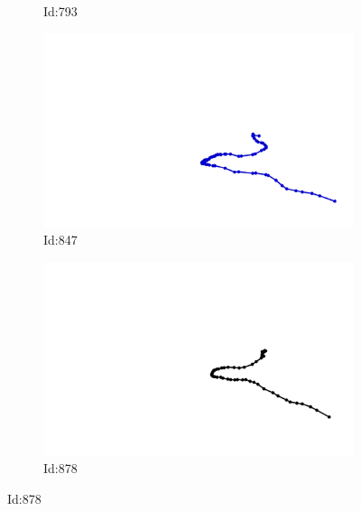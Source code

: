 \documentclass[12pt,twoside]{report}
\begin{document}
\begin{figure}
\begin{subfigure}[b]{0.20\textwidth}
\caption{Id:793}
\end{subfigure}
\begin{subfigure}[b]{0.20\textwidth}
\centering
\includegraphics[width=\textwidth]{../../trajectories/847.png}
\caption{Id:847}
\end{subfigure}
\begin{subfigure}[b]{0.20\textwidth}
\centering
\includegraphics[width=\textwidth]{../../trajectories/878.png}
\caption{Id:878}
\end{subfigure}
\end{figure}
\end{document}
